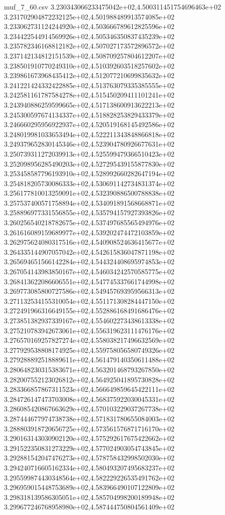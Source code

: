 \begin{filecontents*}{muf_7_60.csv}
3.230343066233475042e+02,4.500311451754696463e+02
3.231702904872232125e+02,4.501988489913574085e+02
3.233062731124244920e+02,4.503666789612825596e+02
3.234422544914569926e+02,4.505346350837435239e+02
3.235782346168812182e+02,4.507027173572896572e+02
3.237142134812151539e+02,4.508709257804612207e+02
3.238501910770249310e+02,4.510392603518257602e+02
3.239861673968435412e+02,4.512077210699835632e+02
3.241221424332422885e+02,4.513763079335385555e+02
3.242581161787584278e+02,4.515450209411101241e+02
3.243940886259599665e+02,4.517138600913622213e+02
3.245300597674134337e+02,4.518828253829433379e+02
3.246660295956922937e+02,4.520519168145492586e+02
3.248019981033653494e+02,4.522211343848866818e+02
3.249379652830145346e+02,4.523904780926677631e+02
3.250739311272039913e+02,4.525599479366510423e+02
3.252098956285490203e+02,4.527295439155877830e+02
3.253458587796193910e+02,4.528992660282647194e+02
3.254818205730086333e+02,4.530691142734831374e+02
3.256177810013259091e+02,4.532390886500788838e+02
3.257537400571758894e+02,4.534091891568668871e+02
3.258896977331556855e+02,4.535794157927393826e+02
3.260256540218782675e+02,4.537497685565494976e+02
3.261616089159689977e+02,4.539202474472103859e+02
3.262975624080317516e+02,4.540908524636415677e+02
3.264335144907057042e+02,4.542615836047871198e+02
3.265694651566142284e+02,4.544324408695974853e+02
3.267054143983850167e+02,4.546034242570585775e+02
3.268413622086606551e+02,4.547745337661744998e+02
3.269773085800727586e+02,4.549457693959566313e+02
3.271132534155310054e+02,4.551171308284447150e+02
3.272491966316649155e+02,4.552886168491686476e+02
3.273851382937339167e+02,4.554602273438613338e+02
3.275210783942673061e+02,4.556319623111476176e+02
3.276570169257827274e+02,4.558038217496632569e+02
3.277929538808174925e+02,4.559758056580749326e+02
3.279288892518889611e+02,4.561479140350611488e+02
3.280648230315383671e+02,4.563201468793267850e+02
3.282007552123026812e+02,4.564925041895730828e+02
3.283366857867311523e+02,4.566649859645422111e+02
3.284726147473703008e+02,4.568375922030045331e+02
3.286085420867663629e+02,4.570103229037267738e+02
3.287444677974738738e+02,4.571831780655084003e+02
3.288803918720656725e+02,4.573561576871716170e+02
3.290163143030902120e+02,4.575292617675422662e+02
3.291522350831273229e+02,4.577024903054743845e+02
3.292881542047476273e+02,4.578758432998502030e+02
3.294240716605162334e+02,4.580493207495683237e+02
3.295599874430348564e+02,4.582229226535491762e+02
3.296959015448753689e+02,4.583966490107122809e+02
3.298318139586305051e+02,4.585704998200189948e+02
3.299677246768958980e+02,4.587444750804561409e+02

\end{filecontents*}
